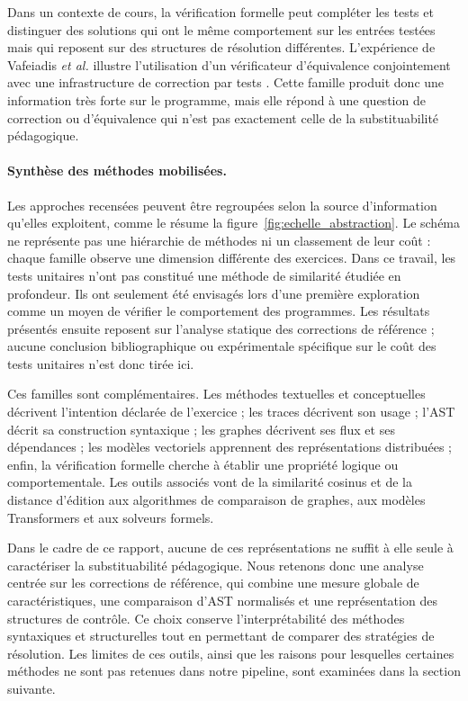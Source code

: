 \documentclass[12pt,a4paper,oneside]{report}
\begin{document}
Dans un contexte de cours, la vérification formelle peut compléter les tests
et distinguer des solutions qui ont le même comportement sur les entrées
testées mais qui reposent sur des structures de résolution différentes.
L'expérience de Vafeiadis \emph{et al.} illustre l'utilisation d'un
vérificateur d'équivalence conjointement avec une infrastructure de
correction par tests \cite{vafeiadis_formal_2025}. Cette famille produit donc
une information très forte sur le programme, mais elle répond à une question
de correction ou d'équivalence qui n'est pas exactement celle de la
substituabilité pédagogique.



\paragraph{Synthèse des méthodes mobilisées.}



Les approches recensées peuvent être regroupées selon la source d'information
qu'elles exploitent, comme le résume la figure~\ref{fig:echelle_abstraction}.
Le schéma ne représente pas une hiérarchie de méthodes ni un classement de
leur coût : chaque famille observe une dimension différente des exercices.
Dans ce travail, les tests unitaires n'ont pas constitué une méthode de
similarité étudiée en profondeur. Ils ont seulement été envisagés lors d'une
première exploration comme un moyen de vérifier le comportement des
programmes. Les résultats présentés ensuite reposent sur l'analyse statique
des corrections de référence ; aucune conclusion bibliographique ou
expérimentale spécifique sur le coût des tests unitaires n'est donc tirée ici.

Ces familles sont complémentaires. Les méthodes textuelles et conceptuelles
décrivent l'intention déclarée de l'exercice ; les traces décrivent son usage ;
l'AST décrit sa construction syntaxique ; les graphes décrivent ses flux et
ses dépendances ; les modèles vectoriels apprennent des représentations
distribuées ; enfin, la vérification formelle cherche à établir une propriété
logique ou comportementale. Les outils associés vont de la similarité cosinus
et de la distance d'édition aux algorithmes de comparaison de graphes, aux
modèles Transformers et aux solveurs formels.

Dans le cadre de ce rapport, aucune de ces représentations ne suffit à elle
seule à caractériser la substituabilité pédagogique. Nous retenons donc une
analyse centrée sur les corrections de référence, qui combine une mesure
globale de caractéristiques, une comparaison d'AST normalisés et une
représentation des structures de contrôle. Ce choix conserve
l'interprétabilité des méthodes syntaxiques et structurelles tout en
permettant de comparer des stratégies de résolution. Les limites de ces
outils, ainsi que les raisons pour lesquelles certaines méthodes ne sont pas
retenues dans notre pipeline, sont examinées dans la section suivante.
\end{document}
